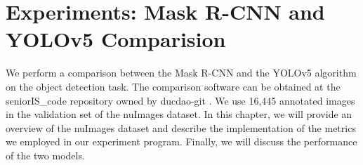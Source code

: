 \chapter{Experiments: Mask R-CNN and YOLOv5 Comparision} \label{chap:experiments}

We perform a comparison between the Mask R-CNN and the YOLOv5 algorithm on the object detection task. The comparison software can be obtained at the seniorIS\_code repository owned by ducdao-git \cite{experiment_repo}. We use 16,445 annotated images in the validation set of the nuImages dataset. In this chapter, we will provide an overview of the nuImages dataset and describe the implementation of the metrics we employed in our experiment program. Finally, we will discuss the performance of the two models.








